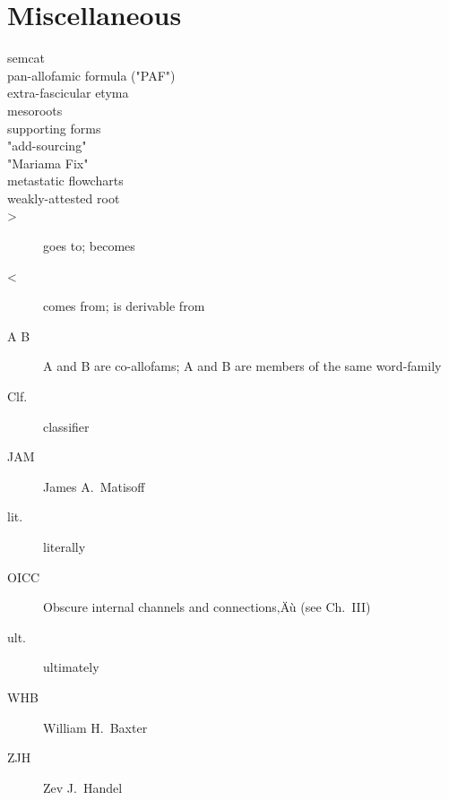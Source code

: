 \section*{Miscellaneous}
\begin{multicols}{2}
\begin{description}
\item[semcat]
\item[pan-allofamic formula ("PAF")]
\item[extra-fascicular etyma]
\item[mesoroots]
\item[supporting forms]
\item["add-sourcing"]
\item["Mariama Fix"]
\item[metastatic flowcharts]
\item[weakly-attested root]
\item[>]	goes to; becomes
\item[<]	comes from; is derivable from
\item[A  B]		A and B are co-allofams; A and B are members of the same word-family
\item[Clf.]	classifier
\item[JAM]	James A.\ Matisoff
\item[lit.]	literally
\item[OICC]	Obscure internal channels and connections‚Äù (see Ch.~III)
\item[ult.]	ultimately
\item[WHB]	William H.\ Baxter
\item[ZJH]	Zev J.\ Handel
\end{description}
\end{multicols}

\cleartooddpage[\thispagestyle{empty}]

